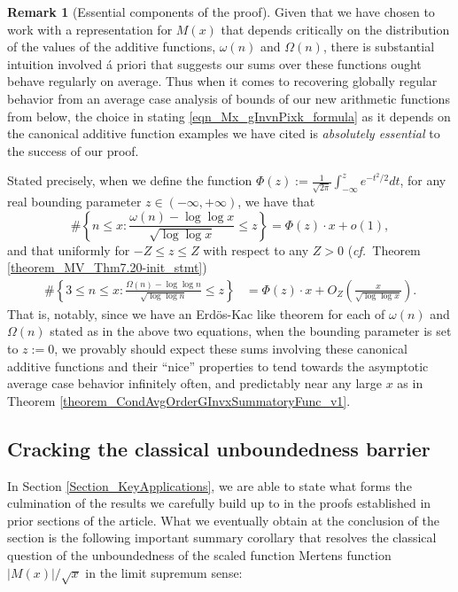 \documentclass[11pt,reqno,a4letter]{article}
\numberwithin{figure}{section}
\numberwithin{table}{section}
\newcommand{\cf}{\textit{cf.\ }}
\theoremstyle{plain}
\numberwithin{theorem}{section}
\theoremstyle{definition}
\newtheorem{remark}[theorem]{Remark}
\begin{document}
\begin{remark}[Essential components of the proof]
Given that we have chosen to work with a representation for $M(x)$ that depends critically on 
the distribution of the values of the additive functions, $\omega(n)$ and $\Omega(n)$, there is 
substantial intuition involved \'{a} priori that suggests our sums over these functions ought 
behave regularly on average. 
Thus when it comes to recovering globally regular behavior from an 
average case analysis of bounds of our new arithmetic functions from below, 
the choice in stating \eqref{eqn_Mx_gInvnPixk_formula} as it depends on the 
canonical additive function examples we have cited is 
\emph{absolutely essential} to the success of our proof.  

Stated precisely, when we define the function 
$\Phi(z) := \frac{1}{\sqrt{2\pi}} \int_{-\infty}^{z} e^{-t^2/2} dt$,  
for any real bounding parameter $z \in (-\infty, +\infty)$, we have that 
\cite[\S 1.7]{IWANIEC-KOWALSKI} 
\[
\#\left\{n \leq x: \frac{\omega(n) - \log\log x}{\sqrt{\log\log x}} \leq z\right\} = 
     \Phi(z) \cdot x + o(1), 
\]
and that uniformly for $-Z \leq z \leq Z$ with respect to any $Z > 0$ \cite[\S 7.4]{MV} 
(\cf Theorem \ref{theorem_MV_Thm7.20-init_stmt})
\begin{align*} 
\#\left\{3 \leq n \leq x: \frac{\Omega(n) - \log\log n}{\sqrt{\log\log n}} \leq z\right\} & = 
     \Phi(z) \cdot x + O_Z\left(\frac{x}{\sqrt{\log\log x}}\right). 
\end{align*} 
That is, notably, since we have an Erd\"os-Kac like theorem for each of 
$\omega(n)$ and $\Omega(n)$ stated as in the above two equations, 
when the bounding parameter is set to $z := 0$, we provably 
should expect these sums involving these canonical additive functions and their 
``nice'' properties to tend towards the 
asymptotic average case behavior infinitely often, and predictably near any large $x$ 
as in Theorem \ref{theorem_CondAvgOrderGInvxSummatoryFunc_v1}. 
\end{remark} 

\subsection{Cracking the classical unboundedness barrier} 

In Section \ref{Section_KeyApplications}, 
we are able to state what forms the culmination of the results 
we carefully build up to in the proofs established in prior sections of the article. 
What we eventually obtain at the conclusion of the section 
is the following important summary corollary that resolves the classical question of the 
unboundedness of the scaled function Mertens function 
$|M(x)| / \sqrt{x}$ in the limit supremum sense: 
\end{document}
